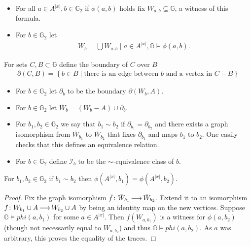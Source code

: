 \documentclass{amsart}
\newcommand{\II}{\mathscr I}
\newcommand{\GG}{\mathbb G}
\newcommand{\ppp}{\partial}
\newcommand{\curly}[1]{\left\{#1\right\}}
\begin{document}
\begin{Definition}
  \begin{itemize}
  \item For all $a \in A^{|x|}, b \in \GG_2$ if $\phi(a, b)$ holds fix $W_{a,b} \subseteq \GG$, a witness of this formula.
  \item For $b \in \GG_2$ let 
    \begin{align*}
      W_b = \bigcup {W_{a,b} \mid a \in A^{|x|}, \GG \models \phi(a,b)}.
    \end{align*}
  \end{itemize}
\end{Definition}

\begin{Definition}
  For sets $C, B \subset \GG$ define the boundary of $C$ over $B$
  \begin{align*}
    \partial(C, B) = \curly{b \in B \mid \text{there is an edge between $b$ and a vertex in $C - B$}}
  \end{align*}
\end{Definition}

\begin{Definition}
  \begin{itemize}
  \item For $b \in \GG_2$ let $\partial_b$ to be the boundary $\partial(W_b, A)$.
  \item For $b \in \GG_2$ let $\bar W_b = (W_b - A) \cup \ppp_b$.
  \item For $b_1, b_2 \in \GG_2$ we say that $b_1 \sim b_2$ if $\ppp_{b_1} = \ppp_{b_2}$
    and there exists a graph isomorphism from $\bar W_{b_1}$ to $\bar W_{b_2}$ that fixes $\ppp_{b_1}$ and
    maps $b_1$ to $b_2$.
    One easily checks that this defines an equivalence relation.
  \item For $b \in \GG_2$ define $\II_b$ to be the $\sim$-equivalence class of $b$.
  \end{itemize}
\end{Definition}

\begin{Lemma} \label {bound_trace}
  For $b_1, b_2 \in \GG_2$ if $b_1 \sim b_2$ then $\phi(A^{|x|}, b_1) = \phi(A^{|x|}, b_2)$.
\end{Lemma}

\begin{proof}
  Fix the graph isomorphism $\bar f \colon \bar W_{b_1} \operatorname{\longrightarrow} \bar W_{b_2}$.
  Extend it to an isomorphism $f \colon W_{b_1} \cup A \operatorname{\longrightarrow} W_{b_2} \cup A$ by being an identity map on the new vertices.
  Suppose $\GG \models phi(a, b_1)$ for some $a \in A^{|x|}$.
  Then $f(W_{a, b_1})$ is a witness for  $\phi(a, b_2)$ (though not necessarily equal to $W_{a, b_2}$)
  and thus $\GG \models phi(a, b_2)$.
  As $a$ was arbitrary, this proves the equality of the traces.
\end{proof}
\end{document}
